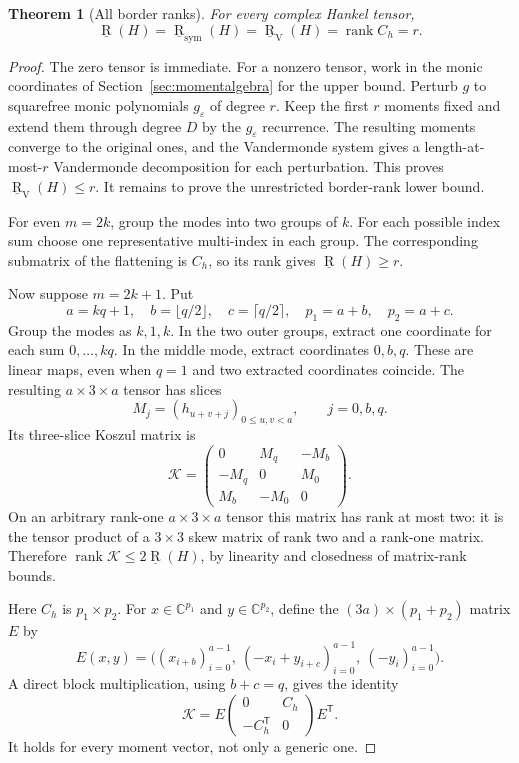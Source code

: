 \documentclass[11pt]{article}
\newtheorem{theorem}{Theorem}[section]
\theoremstyle{definition}
\theoremstyle{remark}
\newcommand{\C}{\mathbb C}
\newcommand{\BR}{\underline{\operatorname{R}}}
\newcommand{\BSR}{\underline{\operatorname{R}}_{\mathrm{sym}}}
\newcommand{\BVR}{\underline{\operatorname{R}}_{\mathrm V}}
\newcommand{\rank}{\operatorname{rank}}
\begin{document}
\begin{theorem}[All border ranks]\label{thm:border}
For every complex Hankel tensor,
\begin{equation}\label{eq:border}
 \BR(H)=\BSR(H)=\BVR(H)=\rank C_h=r.
\end{equation}
\end{theorem}
\begin{proof}
The zero tensor is immediate. For a nonzero tensor, work in the monic
coordinates of Section~\ref{sec:momentalgebra} for the upper bound.
Perturb $g$ to squarefree monic polynomials $g_\varepsilon$ of degree $r$.
Keep the first $r$ moments fixed and extend them through degree $D$ by the
$g_\varepsilon$ recurrence. The resulting moments converge to the original
ones, and the Vandermonde system gives a length-at-most-$r$ Vandermonde
decomposition for each perturbation. This proves $\BVR(H)\le r$.
It remains to prove the unrestricted border-rank lower bound.

For even $m=2k$, group the modes into two groups of $k$. For each possible
index sum choose one representative multi-index in each group.
The corresponding submatrix of the flattening is $C_h$, so its rank gives
$\BR(H)\ge r$.

Now suppose $m=2k+1$. Put
\[
 a=kq+1,\quad b=\lfloor q/2\rfloor,\quad c=\lceil q/2\rceil,
 \quad p_1=a+b,\quad p_2=a+c.
\]
Group the modes as $k,1,k$. In the two outer groups, extract one coordinate
for each sum $0,\ldots,kq$. In the middle mode, extract coordinates $0,b,q$.
These are linear maps, even when $q=1$ and two extracted coordinates coincide.
The resulting $a\times3\times a$ tensor has slices
\[
 M_j=(h_{u+v+j})_{0\le u,v<a},\qquad j=0,b,q.
\]
Its three-slice Koszul matrix is
\begin{equation}\label{eq:K}
 \mathcal K=\begin{pmatrix}
 0&M_q&-M_b\\-M_q&0&M_0\\M_b&-M_0&0
 \end{pmatrix}.
\end{equation}
On an arbitrary rank-one $a\times3\times a$ tensor this matrix has rank at
most two: it is the tensor product of a $3\times3$ skew matrix of rank two
and a rank-one matrix. Therefore
$\rank\mathcal K\le2\BR(H)$, by linearity and closedness of matrix-rank bounds.

Here $C_h$ is $p_1\times p_2$. For $x\in\C^{p_1}$ and $y\in\C^{p_2}$,
define the $(3a)\times(p_1+p_2)$ matrix $E$ by
\begin{equation}\label{eq:E}
 E(x,y)=\bigl((x_{i+b})_{i=0}^{a-1},\
                  (-x_i+y_{i+c})_{i=0}^{a-1},\
                  (-y_i)_{i=0}^{a-1}\bigr).
\end{equation}
A direct block multiplication, using $b+c=q$, gives the identity
\begin{equation}\label{eq:identity}
 \boxed{\displaystyle
 \mathcal K=E\begin{pmatrix}0&C_h\\-C_h^{\mathsf T}&0\end{pmatrix}E^{\mathsf T}.}
\end{equation}
It holds for every moment vector, not only a generic one.


\end{proof}
\end{document}
